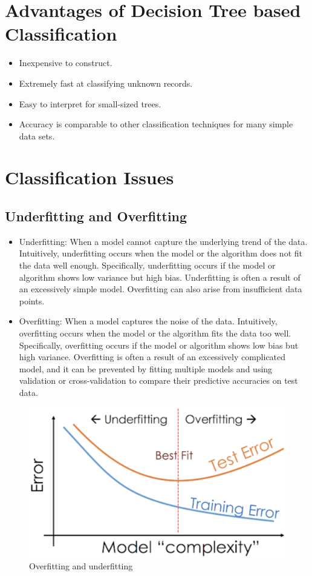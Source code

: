 \section{Advantages of Decision Tree based Classification}
\begin{itemize}
    \item Inexpensive to construct.
    \item Extremely fast at classifying unknown records.
    \item Easy to interpret for small-sized trees.
    \item Accuracy is comparable to other classification techniques for many simple data sets.
\end{itemize}

\section{Classification Issues}
\subsection{Underfitting and Overfitting}
\begin{itemize}
    \item Underfitting: When a model cannot capture the underlying trend of the data. Intuitively, underfitting occurs when the model or the algorithm does not fit the data well enough. Specifically, underfitting occurs if the model or algorithm shows low variance but high bias. Underfitting is often a result of an excessively simple model. Overfitting can also arise from insufficient data points.
    \item Overfitting: When a model captures the noise of the data. Intuitively, overfitting occurs when the model or the algorithm fits the data too well. Specifically, overfitting occurs if the model or algorithm shows low bias but high variance. Overfitting is often a result of an excessively complicated model, and it can be prevented by fitting multiple models and using validation or cross-validation to compare their predictive accuracies on test data.
\end{itemize}
\bigskip
\begin{figure}[H]
    \centering
    \includegraphics[scale=0.25]{figures/overunderfitting.png}
    \caption{Overfitting and underfitting}
\end{figure}

